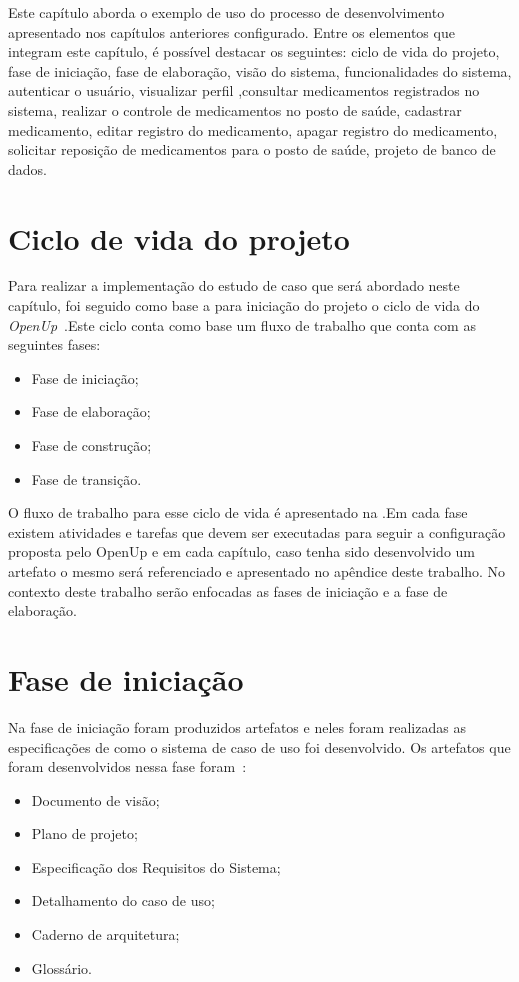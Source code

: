 Este capítulo aborda o exemplo de uso do processo de desenvolvimento apresentado nos capítulos anteriores configurado. Entre os elementos que integram este capítulo, é possível destacar os seguintes: ciclo de vida do projeto, fase de iniciação, fase de elaboração, visão do sistema, funcionalidades do sistema, autenticar o usuário, visualizar perfil ,consultar medicamentos registrados no sistema, realizar o controle de medicamentos no posto de saúde, cadastrar medicamento, editar registro do medicamento, apagar registro do medicamento, solicitar reposição de medicamentos para o posto de saúde, projeto de banco de dados.

\section{Ciclo de vida do projeto}
Para realizar a implementação do estudo de caso que será abordado neste capítulo, foi seguido como base a para iniciação do projeto o ciclo de vida do \emph{OpenUp}~\cite{openup}.Este ciclo conta como base um fluxo de trabalho que conta com as seguintes fases:
\begin{itemize}
    \item Fase de iniciação;
    \item Fase de elaboração;
    \item Fase de construção;
    \item Fase de transição.
\end{itemize}

%

O fluxo de trabalho para esse ciclo de vida é apresentado na .Em cada fase existem atividades e tarefas que devem ser executadas para seguir a configuração proposta pelo OpenUp e em cada capítulo, caso tenha sido desenvolvido um artefato o mesmo será referenciado e apresentado no apêndice deste trabalho. No contexto deste trabalho serão enfocadas as fases de iniciação e a fase de elaboração.

\section{Fase de iniciação}

Na fase de iniciação foram produzidos artefatos e neles foram realizadas as especificações de como o sistema de caso de uso foi desenvolvido. Os artefatos que foram desenvolvidos nessa fase foram~\cite{openup}:
\begin{itemize}
    \item Documento de visão;
    \item Plano de projeto;
    \item Especificação dos Requisitos do Sistema;
    \item Detalhamento do caso de uso;
    \item Caderno de arquitetura;
    \item Glossário.
\end{itemize}

